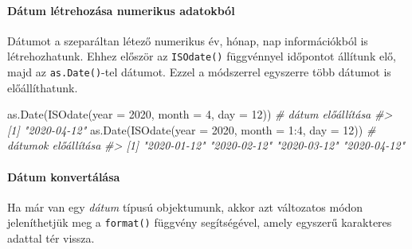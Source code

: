 \documentclass[
]{book}
\newenvironment{Shaded}{\begin{snugshade}}{\end{snugshade}}
\newcommand{\AttributeTok}[1]{\textcolor[rgb]{0.77,0.63,0.00}{#1}}
\newcommand{\CommentTok}[1]{\textcolor[rgb]{0.56,0.35,0.01}{\textit{#1}}}
\newcommand{\DecValTok}[1]{\textcolor[rgb]{0.00,0.00,0.81}{#1}}
\newcommand{\FunctionTok}[1]{\textcolor[rgb]{0.00,0.00,0.00}{#1}}
\newcommand{\NormalTok}[1]{#1}
\newcommand{\SpecialCharTok}[1]{\textcolor[rgb]{0.00,0.00,0.00}{#1}}
\begin{document}
\hypertarget{duxe1tum-luxe9trehozuxe1sa-numerikus-adatokbuxf3l}{%
\paragraph{Dátum létrehozása numerikus adatokból}\label{duxe1tum-luxe9trehozuxe1sa-numerikus-adatokbuxf3l}}

Dátumot a szeparáltan létező numerikus év, hónap, nap információkból is létrehozhatunk. Ehhez először az \texttt{ISOdate()} függvénnyel időpontot állítunk elő, majd az \texttt{as.Date()}-tel dátumot. Ezzel a módszerrel egyszerre több dátumot is előállíthatunk.

\begin{Shaded}
\begin{Highlighting}[]
\FunctionTok{as.Date}\NormalTok{(}\FunctionTok{ISOdate}\NormalTok{(}\AttributeTok{year =} \DecValTok{2020}\NormalTok{, }\AttributeTok{month =} \DecValTok{4}\NormalTok{, }\AttributeTok{day =} \DecValTok{12}\NormalTok{))   }\CommentTok{\# dátum előállítása}
\CommentTok{\#\textgreater{} [1] "2020{-}04{-}12"}
\FunctionTok{as.Date}\NormalTok{(}\FunctionTok{ISOdate}\NormalTok{(}\AttributeTok{year =} \DecValTok{2020}\NormalTok{, }\AttributeTok{month =} \DecValTok{1}\SpecialCharTok{:}\DecValTok{4}\NormalTok{, }\AttributeTok{day =} \DecValTok{12}\NormalTok{)) }\CommentTok{\# dátumok előállítása}
\CommentTok{\#\textgreater{} [1] "2020{-}01{-}12" "2020{-}02{-}12" "2020{-}03{-}12" "2020{-}04{-}12"}
\end{Highlighting}
\end{Shaded}

\hypertarget{duxe1tum-konvertuxe1luxe1sa}{%
\paragraph{Dátum konvertálása}\label{duxe1tum-konvertuxe1luxe1sa}}

Ha már van egy \emph{dátum} típusú objektumunk, akkor azt változatos módon jeleníthetjük meg a \texttt{format()} függvény segítségével, amely egyszerű karakteres adattal tér vissza.
\end{document}
